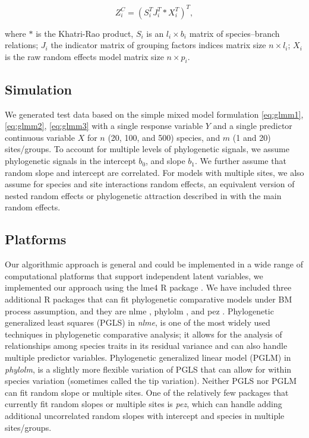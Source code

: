 \begin{equation}
Z^{C}_{i} = (S^{T}_{i}J^{T}_{i} \ast X^{T}_{i})^{T}, \label{eq:ZC}
\end{equation}


where $\ast$ is the Khatri-Rao product, $S_{i}$ is an $l_{i} \times b_{i}$ matrix of species--branch relations; $J_{i}$ the indicator matrix of grouping factors indices matrix size $n \times l_{i}$; $X_{i}$ is the raw random effects model matrix size $n \times p_{i}$. 

\subsection{Simulation}

We generated test data based on the simple mixed model formulation \ref{eq:glmm1}, \ref{eq:glmm2}, \ref{eq:glmm3} with a single response variable $Y$ and a single predictor continuous variable $X$ for $n$ (20, 100, and 500) species, and $m$ (1 and 20) sites/groups. 
To account for multiple levels of phylogenetic signals, we assume phylogenetic signals in the intercept $b_0$, and slope $b_1$.
We further assume that random slope and intercept are correlated. 
For models with multiple sites, we also assume for species and site interactions random effects, an equivalent version of nested random effects or phylogenetic attraction described in \cite{helmus2007separating} with the main random effects.

\subsection{Platforms}

Our algorithmic approach is general and could be implemented in a wide range of computational platforms that support independent latent variables, we implemented our approach using the lme4 R package \citep{bates2015fitting}.
We have included three additional R packages that can fit phylogenetic comparative models under BM process assumption, and they are nlme \citep{pinheiro2014r}, phylolm \citep{ho2014phylolm}, and pez \citep{pearse2015pez}.
Phylogenetic generalized least squares (PGLS) in \textit{nlme}, is one of the most widely used techniques in phylogenetic comparative analysis; it allows for the analysis of relationships among species traits in its residual variance and can also handle multiple predictor variables.
Phylogenetic generalized linear model (PGLM) in \textit{phylolm}, is a slightly more flexible variation of PGLS that can allow for within species variation (sometimes called the tip variation). 
Neither PGLS nor PGLM can fit random slope or multiple sites. 
One of the relatively few packages that currently fit random slopes or multiple sites is \textit{pez}, which can handle adding additional uncorrelated random slopes with intercept and species in multiple sites/groups.  


